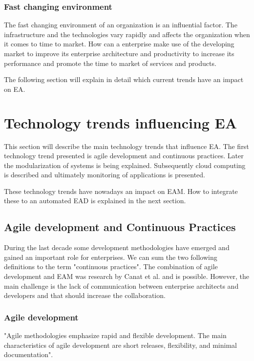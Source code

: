 \subsubsection{Fast changing environment}
The fast changing environment of an organization is an influential factor. The infrastructure and the technologies vary rapidly and affects the organization when it comes to time to market. How can a enterprise make use of the developing market to improve its enterprise architecture and productivity to increase its performance and promote the time to market of services and products. \cite{Kaisler2005}\cite{Lucke2010}\cite{Roth2013}


The following section will explain in detail which current trends have an impact on EA.


\section{Technology trends influencing EA}

This section will describe the main technology trends that influence EA. The first technology trend presented is agile development and continuous practices. Later the modularization of systems is being explained. Subsequently cloud computing is described and ultimately monitoring of applications is presented.

These technology trends have nowadays an impact on EAM. How to integrate these to an automated EAD is explained in the next section. 

\subsection{Agile development and Continuous Practices}

During the last decade some development methodologies have emerged and gained an important role for enterprises. We can sum the two following definitions to the term "continuous practices". The combination of agile development and EAM was research by Canat et al. \cite{Canat2018} and is possible. However, the main challenge is the lack of communication between enterprise architects and developers and that should increase the collaboration. \cite{Canat2018}

\subsubsection{Agile development}
"Agile methodologies emphasize rapid and flexible development. The main characteristics of agile development are short releases, flexibility, and minimal documentation". \cite{Hadar2013}

